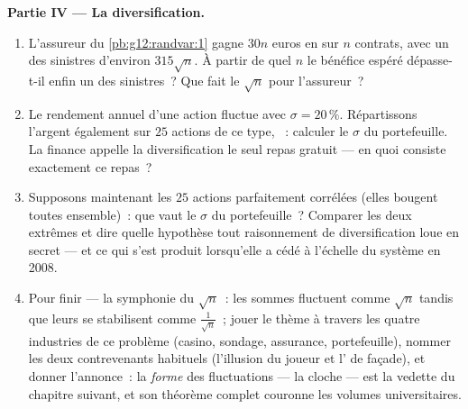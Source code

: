 \begin{problem}
\medskip
\noindent\textbf{Partie IV --- La diversification.}
\begin{enumerate}[resume]
  \item L'assureur du \cref{pb:g12:randvar:1} gagne $30n$ euros en
         sur $n$ contrats, avec un  des sinistres
        d'environ $315\sqrt n$. À partir de quel $n$ le bénéfice
        espéré dépasse-t-il enfin un  des sinistres~? Que
        fait le $\sqrt n$ pour l'assureur~?
  \item Le rendement annuel d'une action fluctue avec
        $\sigma = 20\,\%$. Répartissons l'argent également sur $25$
        actions de ce type, \emph{}~: calculer le
        $\sigma$ du portefeuille. La finance appelle la
        diversification le seul repas gratuit --- en quoi consiste
        exactement ce repas~?
  \item Supposons maintenant les $25$ actions parfaitement
        corrélées (elles bougent toutes ensemble)~: que vaut le
        $\sigma$ du portefeuille~? Comparer les deux extrêmes et
        dire quelle hypothèse tout raisonnement de diversification
        loue en secret --- et ce qui s'est produit lorsqu'elle a
        cédé à l'échelle du système en 2008.
  \item Pour finir --- la symphonie du $\sqrt n$~: les sommes
        fluctuent comme $\sqrt n$ tandis que leurs  se
        stabilisent comme $\frac{1}{\sqrt n}$~; jouer le thème à
        travers les quatre industries de ce problème (casino,
        sondage, assurance, portefeuille), nommer les deux
        contrevenants habituels (l'illusion du joueur et
        l' de façade), et donner l'annonce~: la
        \emph{forme} des fluctuations --- la cloche --- est la
        vedette  du chapitre suivant, et son théorème
        complet couronne les volumes universitaires.
\end{enumerate}
\end{problem}
